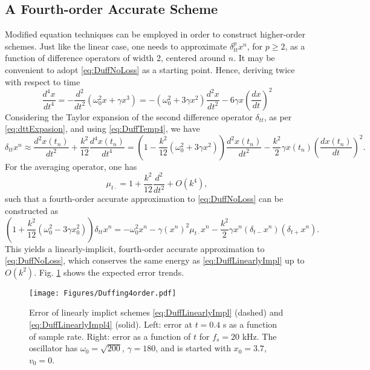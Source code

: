 \documentclass[11pt,twoside,a4paper,english]{book}
\newcommand{\dtp}{\delta_{t+}}
\newcommand{\dtm}{\delta_{t-}}
\newcommand{\dtt}{\delta_{tt}}
\newcommand{\mtd}{\mu_{t\cdot}}
\begin{document}
\subsection{A Fourth-order Accurate Scheme}

Modified equation techniques can be employed in order to construct higher-order schemes. Just like the linear case, one needs to approximate $\dtt^p x^n$, for $p\geq 2$, as a function of difference operators of width 2, centered around $n$. It may be convenient to adopt \eqref{eq:DuffNoLoss} as a starting point. Hence, deriving twice with respect to time 
\begin{equation}\label{eq:DuffTemp4}
\frac{d^4 x}{dt^4} = - \frac{d^2}{dt^2}\left( \omega_0^2 x + \gamma x^3\right) = -(\omega_0^2+3\gamma x^2) \frac{d^2x}{dt^2} -6\gamma x \left(\frac{dx}{dt}\right)^2
\end{equation}
Considering the Taylor expansion of the second difference operator $\dtt$, as per \eqref{eq:dttExpasion}, and using \eqref{eq:DuffTemp4}, we have
\begin{equation}
\dtt x^n \approx \frac{d^2 x(t_n)}{dt^2} + \frac{k^2}{12}\frac{d^4 x (t_n)}{dt^4} =\left(1 - \frac{k^2}{12}(\omega_0^2+3\gamma x^2) \right) \frac{d^2 x(t_n)}{dt^2} - \frac{k^2}{2} \gamma x(t_n) \left(\frac{dx(t_n)}{dt}\right)^2.
\end{equation}
For the averaging operator, one has
\begin{equation}
\mtd = 1 + \frac{k^2}{12}\frac{d^2}{dt^2} + O(k^4),
\end{equation}
such that a fourth-order accurate approximation to \eqref{eq:DuffNoLoss} can be constructed as
\begin{equation}\label{eq:DuffLinearlyImpl4}
\left(1 + \frac{k^2}{12} \left(\omega_0^2-3\gamma x_0^2\right) \right) \dtt x^n = -\omega_0^2 x^n - \gamma (x^n)^2 \mtd x^n - \frac{k^2}{2}\gamma x^n (\dtm x^n)(\dtp x^n).
\end{equation}
This yields a linearly-implicit, fourth-order accurate approximation to \eqref{eq:DuffNoLoss}, which conserves the same energy as \eqref{eq:DuffLinearlyImpl} up to $O(k^2)$. Fig. \ref{fig:duff4Err} shows the expected error trends. 
\begin{figure}
\texttt{[image: Figures/Duffing4order.pdf]}
\caption{Error of linearly implict schemes \eqref{eq:DuffLinearlyImpl} (dashed) and \eqref{eq:DuffLinearlyImpl4} (solid). Left: error at $t=0.4$ s as a function of sample rate. Right: error as a function of $t$ for $f_s=20$ kHz. The oscillator has $\omega_0 = \sqrt{200}$, $\gamma = 180$, and is started with $x_0= 3.7$, $v_0=0$. }\label{fig:duff4Err}
\end{figure}
\end{document}
